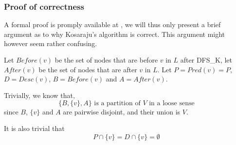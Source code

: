 \subsubsection{Proof of correctness}
A formal proof is promply available at \cite[p.~619]{intro-alg}, we will thus only present a brief argument as to why Kosaraju's algorithm is correct. This argument might however seem rather confusing.\par
Let $Before(v)$ be the set of nodes that are before $v$ in $L$ after \textsc{DFS\_K}, let $After(v)$ be the set of nodes that are after $v$ in $L$. Let $P = Pred(v)=P$, $D = Desc(v)$, $B = Before(v)$ and $A=After(v)$.\par
Trivially, we know that,
\begin{equation} \label{eq:ABpart}
    \{B, \{v\}, A\}\text{ is a partition of $V$ in a loose sense}
\end{equation}
since $B$, $\{v\}$ and $A$ are pairwise disjoint, and their union is $V$.\par
It is also trivial that
\begin{equation} \label{eq:vnotinPD}
    P \cap \{v\} = D\cap\{v\}=\emptyset
\end{equation}

